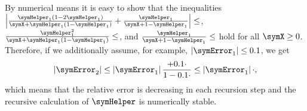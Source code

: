 \documentclass[a4paper]{scrartcl}
\begin{document}
By numerical means it is easy to show that the inequalities $\left|
\frac{\symHelper_1\left(1-2\symHelper_1\right)}{\symX+\symHelper_1\left(1-\symHelper_1\right)}
+
\frac{\symHelper_1}{\symX+1-\symHelper_1}
\right|\leq
$,
$\frac{\symHelper_1^2}{\symX+\symHelper_1\left(1-\symHelper_1\right)}
\leq$,
and
$\frac{\symHelper_1}{\symX+1-\symHelper_1}\leq$ hold for all $\symX\geq0$. Therefore, if we additionally assume, for example, $\left|\symError_1\right|\leq0.1$, we get
\begin{equation}
\left|\symError_2\right|
\leq
\left|\symError_1\right|
\frac{ + 0.1\cdot}{1-0.1\cdot}
\leq
\left|\symError_1\right|
\cdot
,
\end{equation}
which means that the relative error is decreasing in each recursion step and the recursive calculation of $\symHelper$ is numerically stable.
\end{document}
